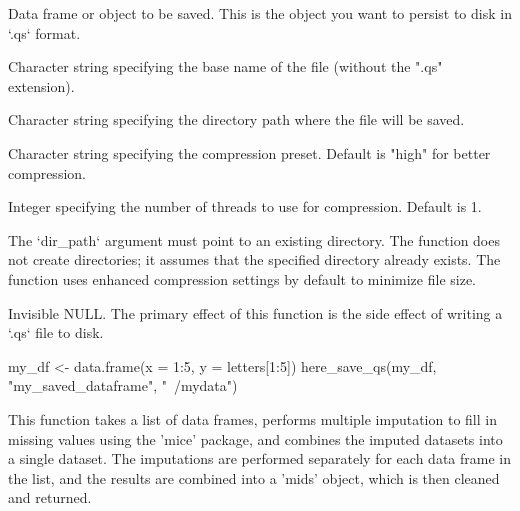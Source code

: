 \documentclass[a4paper]{book}
\begin{document}
\begin{Arguments}
\begin{ldescription}
\item[\code{obj}] Data frame or object to be saved. This is the object you want to persist to disk in `.qs` format.

\item[\code{name}] Character string specifying the base name of the file (without the ".qs" extension).

\item[\code{dir\_path}] Character string specifying the directory path where the file will be saved.

\item[\code{preset}] Character string specifying the compression preset. Default is "high" for better compression.

\item[\code{nthreads}] Integer specifying the number of threads to use for compression. Default is 1.
\end{ldescription}
\end{Arguments}
%
\begin{Details}
The `dir\_path` argument must point to an existing directory. The function does not create directories; it assumes that the specified directory already exists.
The function uses enhanced compression settings by default to minimize file size.
\end{Details}
%
\begin{Value}
Invisible NULL. The primary effect of this function is the side effect of writing a `.qs` file to disk.
\end{Value}
%
\begin{Examples}
\begin{ExampleCode}
my_df <- data.frame(x = 1:5, y = letters[1:5])
here_save_qs(my_df, "my_saved_dataframe", "~/mydata")

\end{ExampleCode}
\end{Examples}
%
\begin{Description}
This function takes a list of data frames, performs multiple imputation to fill in missing
values using the 'mice' package, and combines the imputed datasets into a single dataset.
The imputations are performed separately for each data frame in the list, and the results
are combined into a 'mids' object, which is then cleaned and returned.
\end{Description}
\end{document}
